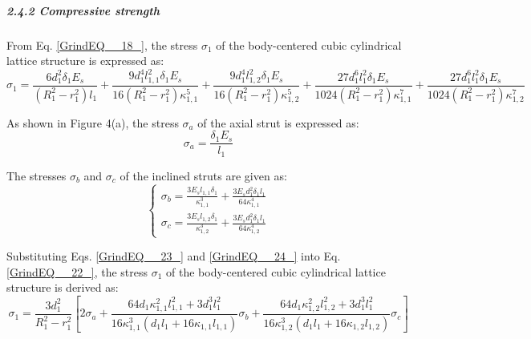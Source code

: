 \documentclass{article} %
\begin{document}
\subparagraph{2.4.2 Compressive strength}

From Eq. \eqref{GrindEQ__18_}, the stress $\sigma _{1} $ of the body-centered cubic cylindrical lattice structure is expressed as:
\begin{equation} \label{GrindEQ__22_} 
\sigma _{1} =\frac{6d_{1}^{2} \delta _{1} E_{s} }{\left(R_{1}^{2} -r_{1}^{2} \right)l_{1} } +\frac{9d_{1}^{4} l_{1,1}^{2} \delta _{1} E_{s} }{16\left(R_{1}^{2} -r_{1}^{2} \right)\kappa _{1,1}^{5} } +\frac{9d_{1}^{4} l_{1,2}^{2} \delta _{1} E_{s} }{16\left(R_{1}^{2} -r_{1}^{2} \right)\kappa _{1,2}^{5} } +\frac{27d_{1}^{6} l_{1}^{2} \delta _{1} E_{s} }{1024\left(R_{1}^{2} -r_{1}^{2} \right)\kappa _{1,1}^{7} } +\frac{27d_{1}^{6} l_{1}^{2} \delta _{1} E_{s} }{1024\left(R_{1}^{2} -r_{1}^{2} \right)\kappa _{1,2}^{7} }  
\end{equation} 

As shown in Figure 4(a), the stress $\sigma _{a} $ of the axial strut is expressed as:
\begin{equation} \label{GrindEQ__23_} 
\sigma _{a} =\frac{\delta _{1} E_{s} }{l_{1} }  
\end{equation} 

The stresses $\sigma _{b} $ and $\sigma _{c} $ of the inclined struts are given as:
\begin{equation} \label{GrindEQ__24_} 
\left\{\begin{array}{l} {\sigma _{b} =\frac{3E_{s} l_{1,1} \delta _{1} }{\kappa _{1,1}^{3} } +\frac{3E_{s} d_{1}^{2} \delta _{1} l_{1} }{64\kappa _{1,1}^{4} } } \\ {\sigma _{c} =\frac{3E_{s} l_{1,2} \delta _{1} }{\kappa _{1,2}^{3} } +\frac{3E_{s} d_{1}^{2} \delta _{1} l_{1} }{64\kappa _{1,2}^{4} } } \end{array}\right.  
\end{equation} 

Substituting Eqs. \eqref{GrindEQ__23_} and \eqref{GrindEQ__24_} into Eq. \eqref{GrindEQ__22_}, the stress $\sigma _{1} $ of the body-centered cubic cylindrical lattice structure is derived as:
\begin{equation} \label{GrindEQ__25_} 
\sigma _{1} =\frac{3d_{1}^{2} }{R_{1}^{2} -r_{1}^{2} } \left[2\sigma _{a} +\frac{64d_{1} \kappa _{1,1}^{2} l_{1,1}^{2} +3d_{1}^{3} l_{1}^{2} }{16\kappa _{1,1}^{3} \left(d_{1} l_{1} +16\kappa _{1,1} l_{1,1} \right)} \sigma _{b} +\frac{64d_{1} \kappa _{1,2}^{2} l_{1,2}^{2} +3d_{1}^{3} l_{1}^{2} }{16\kappa _{1,2}^{3} \left(d_{1} l_{1} +16\kappa _{1,2} l_{1,2} \right)} \sigma _{c} \right] 
\end{equation} 
\end{document}

